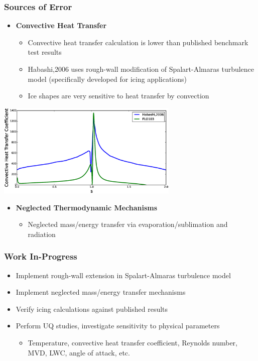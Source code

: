 \documentclass[9pt]{beamer}
\begin{document}
\begin{frame}
\frametitle{Sources of Error}
\label{sec-5-10}

\begin{itemize}
\item \textbf{Convective Heat Transfer}
\begin{itemize}
\item Convective heat transfer calculation is lower than published benchmark test results
\item Habashi,2006 uses rough-wall modification of Spalart-Almaras turbulence model (specifically developed for icing applications)
\item Ice shapes are very sensitive to heat transfer by convection
\end{itemize}
\end{itemize}
    \centering
    \includegraphics[width=0.65\textwidth]{HeatTransferComparison}
\begin{itemize}
\item \textbf{Neglected Thermodynamic Mechanisms}
\begin{itemize}
\item Neglected mass/energy transfer via evaporation/sublimation and radiation
\end{itemize}
\end{itemize}
\end{frame}
\begin{frame}
\frametitle{Work In-Progress}
\label{sec-5-11}

\begin{itemize}
\item Implement rough-wall extension in Spalart-Almaras turbulence model
\item Implement neglected mass/energy transfer mechanisms
\item Verify icing calculations against published results
\item Perform UQ studies, investigate sensitivity to physical parameters
\begin{itemize}
\item Temperature, convective heat transfer coefficient, Reynolds number, MVD, LWC, angle of attack, etc.
\end{itemize}
\end{itemize}
\end{frame}
\end{document}
